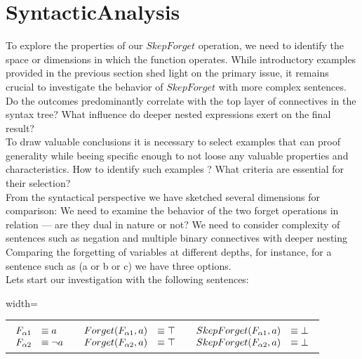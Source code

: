 \section{SyntacticAnalysis}
To explore the properties of our $SkepForget$ operation, we need to identify the space or dimensions in which the function operates.
While introductory examples provided in the previous section shed light on the primary issue, 
it remains crucial to investigate the behavior of $SkepForget$ with more complex sentences. Do the outcomes predominantly correlate 
with the top layer of connectives in the syntax tree? What influence do deeper nested expressions exert on the final result?\\
To draw valuable conclusions it is necessary to select examples that can proof generality while beeing specific enough to not loose any valuable properties and characteristics.
How to identify such examples ? What criteria are essential for their selection?\\From the syntactical perspective we have sketched several dimensions for comparison:
We need to examine the behavior of the two forget operations in relation — are they dual in nature or not?
We need to consider complexity of sentences such as negation and multiple binary connectives with deeper nesting
Comparing the forgetting of variables at different depths, for instance, for a sentence such as (a or b or c) we have three options.\\
Lets start our investigation with the following sentences:\\
\begin{adjustbox}{width=\textwidth}
\begin{tabular}{ c  c  c }
 &  &  \\
$\begin{array}{l l}
F_{\alpha1} &\equiv a\\
F_{\alpha2} &\equiv \lnot a\\
\end{array}$ & $\begin{array}{l l}
Forget(F_{\alpha1},a) &\equiv \top\\
Forget(F_{\alpha2},a) &\equiv \top\\
\end{array}$ & $\begin{array}{l l}
SkepForget(F_{\alpha1},a) &\equiv \bot\\
SkepForget(F_{\alpha2},a) &\equiv \bot\\
\end{array}$\\
\end{tabular}
\end{adjustbox}\newline\newline

